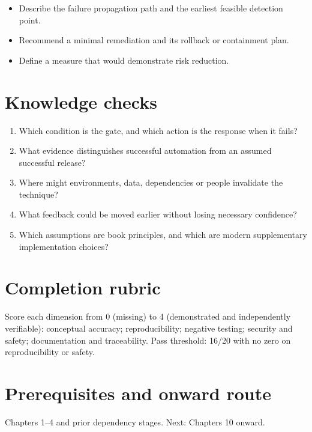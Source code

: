 \documentclass[10pt,letterpaper]{article}
\begin{document}
\begin{itemize}
\item Describe the failure propagation path and the earliest feasible detection point.
\item Recommend a minimal remediation and its rollback or containment plan.
\item Define a measure that would demonstrate risk reduction.
\end{itemize}

\section{Knowledge checks}
\begin{enumerate}
\item Which condition is the gate, and which action is the response when it fails?
\item What evidence distinguishes successful automation from an assumed successful release?
\item Where might environments, data, dependencies or people invalidate the technique?
\item What feedback could be moved earlier without losing necessary confidence?
\item Which assumptions are book principles, and which are modern supplementary implementation choices?
\end{enumerate}

\section{Completion rubric}
Score each dimension from 0 (missing) to 4 (demonstrated and independently verifiable): conceptual accuracy; reproducibility; negative testing; security and safety; documentation and traceability. Pass threshold: 16/20 with no zero on reproducibility or safety.


\section{Prerequisites and onward route}
Chapters 1--4 and prior dependency stages. Next: Chapters 10 onward.
\end{document}
